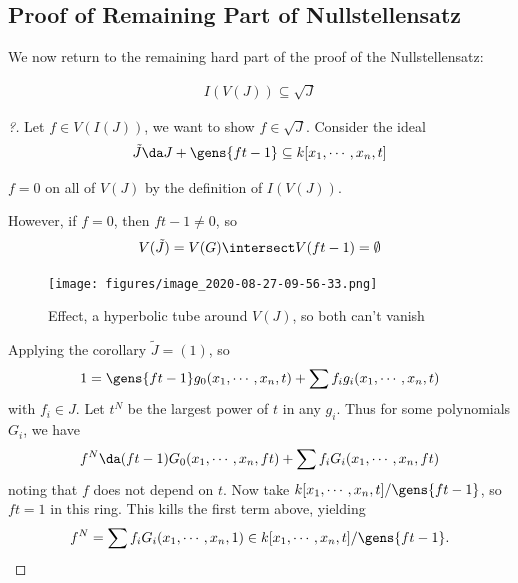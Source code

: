 \hypertarget{proof-of-remaining-part-of-nullstellensatz}{%
\subsection{Proof of Remaining Part of
Nullstellensatz}\label{proof-of-remaining-part-of-nullstellensatz}}

We now return to the remaining hard part of the proof of the
Nullstellensatz:

\begin{align*}
I(V(J)) \subseteq \sqrt{J}
\end{align*}

\begin{proof}[?]

Let \(f\in V(I(J))\), we want to show \(f\in \sqrt{J}\). Consider the
ideal
\begin{align*}
\tilde J \da J + \gens{ft - 1} \subseteq k[x_1, \cdots, x_n, t]
\end{align*}

\begin{observation}

\(f = 0\) on all of \(V(J)\) by the definition of \(I(V(J))\).

\end{observation}

However, if \(f=0\), then \(ft-1 \neq 0\), so
\begin{align*}
V(\tilde J) = V(G) \intersect V(ft-1) = \emptyset
\end{align*}

\begin{figure}
\centering
\texttt{[image: figures/image\_2020-08-27-09-56-33.png]}
\caption{Effect, a hyperbolic tube around \(V(J)\), so both can't
vanish}
\end{figure}

Applying the corollary \(\tilde J = (1)\), so
\begin{align*}
1 = \gens{ft-1} g_0(x_1, \cdots, x_n, t) + \sum f_i g_i(x_1, \cdots, x_n, t)
\end{align*} with \(f_i \in J\). Let \(t^N\) be the largest power of
\(t\) in any \(g_i\). Thus for some polynomials \(G_i\), we have
\begin{align*}  
f^N \da (ft-1) G_0(x_1, \cdots, x_n, ft) + \sum f_i G_i(x_1, \cdots, x_n, ft)
\end{align*} noting that \(f\) does not depend on \(t\). Now take
\(k[x_1, \cdots, x_n, t]/\gens{ft-1}\), so \(ft=1\) in this ring. This
kills the first term above, yielding
\begin{align*}  
f^N = \sum f_i G_i(x_1, \cdots, x_n, 1) \in k[x_1, \cdots, x_n, t]/\gens{ft-1}
.\end{align*}


\end{proof}
